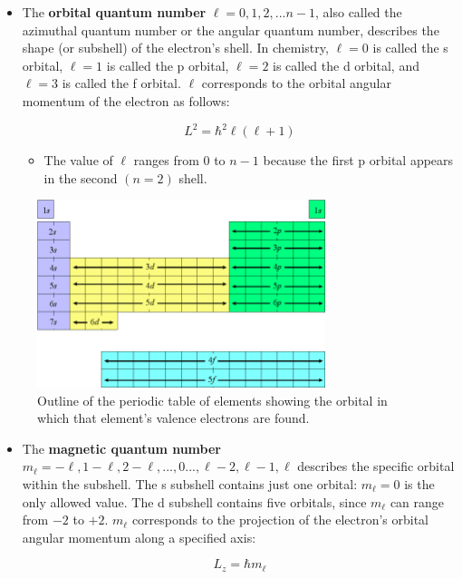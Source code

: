 \documentclass{article}
\newcommand{\be}{\begin{equation}}
\newcommand{\ee}{\end{equation}}
\begin{document}
\begin{itemize}
    \item The \textbf{orbital quantum number} $\ell = 0, 1, 2, ... n-1$, also called the azimuthal quantum number or the angular quantum number, describes the shape (or subshell) of the electron's shell. In chemistry,  $\ell = 0$ is called the s orbital, $\ell = 1$ is called the p orbital, $\ell = 2$ is called the d orbital, and $\ell = 3$ is called the f orbital. $\ell$ corresponds to the orbital angular momentum of the electron as follows:

\be
L^2 = \hbar^2 \ell (\ell + 1)
\ee
    \begin{itemize}
        \item The value of $\ell$ ranges from $0$ to $n-1$ because the first p orbital appears in the second $(n=2)$ shell.
    \end{itemize}
\end{itemize}

\begin{figure}[ht]
    \centering
    \includegraphics[width = 0.75\textwidth]{figures/Periodictable.png}
    \caption{Outline of the periodic table of elements showing the orbital in which that element's valence electrons are found.}
    \label{fig:periodic}
\end{figure} 

\begin{itemize}
    \item The \textbf{magnetic quantum number} $m_\ell = -\ell, 1 - \ell, 2 - \ell, ..., 0 ..., \ell - 2, \ell - 1, \ell$ describes the specific orbital within the subshell. The s subshell contains just one orbital: $m_\ell = 0$ is the only allowed value. The d subshell contains five orbitals, since $m_\ell$ can range from $-2$ to $+2$. $m_\ell$ corresponds to the projection of the electron's orbital angular momentum along a specified axis:
    
    \be
    L_z = \hbar m_\ell
    \ee
    
\end{itemize}
\end{document}

